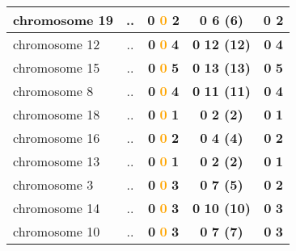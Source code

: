 \begin{table}[H]
\begin{tabular}{||l|c|c|c|c||}
\hline
chromosome 19&..&\textcolor{vert}{\textbf{0}} \textcolor{orange}{\textbf{0}} \textcolor{rose}{\textbf{2}} &\textcolor{vert}{\textbf{0}} \textcolor{rose}{\textbf{6 (6)}} &\textcolor{vert}{\textbf{0}} \textcolor{rose}{\textbf{2}} \\
\hline
chromosome 12&..&\textcolor{vert}{\textbf{0}} \textcolor{orange}{\textbf{0}} \textcolor{rose}{\textbf{4}} &\textcolor{vert}{\textbf{0}} \textcolor{rose}{\textbf{12 (12)}} &\textcolor{vert}{\textbf{0}} \textcolor{rose}{\textbf{4}} \\
\hline
chromosome 15&..&\textcolor{vert}{\textbf{0}} \textcolor{orange}{\textbf{0}} \textcolor{rose}{\textbf{5}} &\textcolor{vert}{\textbf{0}} \textcolor{rose}{\textbf{13 (13)}} &\textcolor{vert}{\textbf{0}} \textcolor{rose}{\textbf{5}} \\
\hline
chromosome 8&..&\textcolor{vert}{\textbf{0}} \textcolor{orange}{\textbf{0}} \textcolor{rose}{\textbf{4}} &\textcolor{vert}{\textbf{0}} \textcolor{rose}{\textbf{11 (11)}} &\textcolor{vert}{\textbf{0}} \textcolor{rose}{\textbf{4}} \\
\hline
chromosome 18&..&\textcolor{vert}{\textbf{0}} \textcolor{orange}{\textbf{0}} \textcolor{rose}{\textbf{1}} &\textcolor{vert}{\textbf{0}} \textcolor{rose}{\textbf{2 (2)}} &\textcolor{vert}{\textbf{0}} \textcolor{rose}{\textbf{1}} \\
\hline
chromosome 16&..&\textcolor{vert}{\textbf{0}} \textcolor{orange}{\textbf{0}} \textcolor{rose}{\textbf{2}} &\textcolor{vert}{\textbf{0}} \textcolor{rose}{\textbf{4 (4)}} &\textcolor{vert}{\textbf{0}} \textcolor{rose}{\textbf{2}} \\
\hline
chromosome 13&..&\textcolor{vert}{\textbf{0}} \textcolor{orange}{\textbf{0}} \textcolor{rose}{\textbf{1}} &\textcolor{vert}{\textbf{0}} \textcolor{rose}{\textbf{2 (2)}} &\textcolor{vert}{\textbf{0}} \textcolor{rose}{\textbf{1}} \\
\hline
chromosome 3&..&\textcolor{vert}{\textbf{0}} \textcolor{orange}{\textbf{0}} \textcolor{rose}{\textbf{3}} &\textcolor{vert}{\textbf{0}} \textcolor{rose}{\textbf{7 (5)}} &\textcolor{vert}{\textbf{0}} \textcolor{rose}{\textbf{2}} \\
\hline
chromosome 14&..&\textcolor{vert}{\textbf{0}} \textcolor{orange}{\textbf{0}} \textcolor{rose}{\textbf{3}} &\textcolor{vert}{\textbf{0}} \textcolor{rose}{\textbf{10 (10)}} &\textcolor{vert}{\textbf{0}} \textcolor{rose}{\textbf{3}} \\
\hline
chromosome 10&..&\textcolor{vert}{\textbf{0}} \textcolor{orange}{\textbf{0}} \textcolor{rose}{\textbf{3}} &\textcolor{vert}{\textbf{0}} \textcolor{rose}{\textbf{7 (7)}} &\textcolor{vert}{\textbf{0}} \textcolor{rose}{\textbf{3}} \\

\end{tabular}
\end{table}
